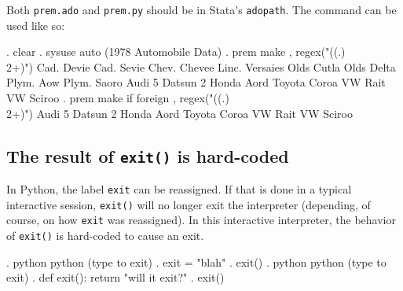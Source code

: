 \documentclass{article}
\begin{document}
\medskip
\medskip

Both \lstinline{prem.ado} and \lstinline{prem.py} should be in Stata's \lstinline{adopath}. The command can be used like so:

\begin{stlog}
. clear
{\smallskip}
. sysuse auto
(1978 Automobile Data)
{\smallskip}
. prem make , regex("((.)\\2+)")
Cad. Devi{}e
Cad. Sevi{}e
Chev. Cheve{}e
Linc. Versai{}es
Olds Cutla{}
Olds Delta {}
Plym. A{}ow
Plym. Sa{}oro
Audi 5{}
Datsun 2{}
Honda A{}ord
Toyota Coro{}a
VW Ra{}it
VW Sciro{}o
{\smallskip}
. prem make if foreign , regex("((.)\\2+)")
Audi 5{}
Datsun 2{}
Honda A{}ord
Toyota Coro{}a
VW Ra{}it
VW Sciro{}o
\end{stlog}

\smallskip



\subsection{The result of \lstinline$exit()$ is hard-coded}

In Python, the label \lstinline$exit$ can be reassigned. If that is done in a typical interactive session, \lstinline$exit()$ will no longer exit the interpreter (depending, of course, on how \lstinline$exit$ was reassigned). In this interactive interpreter, the behavior of \lstinline$exit()$ is hard-coded to cause an exit.

\begin{stlog}
. python
 python (type {} to exit) 
. exit = "blah"
{\smallskip}
. exit()
{\smallskip}
. python
 python (type {} to exit) 
. def exit(): return "will it exit?"
{\smallskip}
. exit()
\end{stlog}

		
\end{document}
